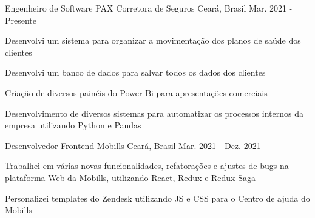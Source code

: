 \begin{cventries}
  \cventry
    {Engenheiro de Software} %
    {PAX Corretora de
    Seguros} %
    {Ceará, Brasil} %
    {Mar. 2021 - Presente} %
    {
      \begin{cvitems} %
        \item {Desenvolvi um sistema para organizar a movimentação dos planos de saúde dos clientes}
        \item {Desenvolvi um banco de dados
        para salvar todos os dados dos clientes}
        \item {Criação de diversos painéis do Power Bi para apresentações comerciais}
        \item {Desenvolvimento de diversos
        sistemas para automatizar os processos internos da empresa utilizando Python e Pandas}
      \end{cvitems}
    }

  \cventry
    {Desenvolvedor Frontend} %
    {Mobills} %
    {Ceará, Brasil} %
    {Mar. 2021 - Dez. 2021} %
    {
      \begin{cvitems} %
        \item {Trabalhei em várias novas
        funcionalidades, refatorações e
        ajustes de bugs na plataforma Web
        da Mobills, utilizando React,
        Redux e Redux Saga}
        \item {Personalizei templates do Zendesk
        utilizando JS e CSS para o Centro
        de ajuda do Mobills}
      \end{cvitems}
    }

\end{cventries}
